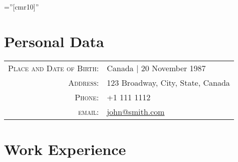 \documentclass[a4paper,10pt]{article} %
\begin{document}
\pagestyle{empty} %

\font\fb=''[cmr10]'' %


\par{\bigskip\par} %

\section{Personal Data}

\begin{tabular}{rl}
  \textsc{Place and Date of Birth:} & Canada  | 20 November 1987                   \\
  \textsc{Address:}                 & 123 Broadway, City, State, Canada            \\
  \textsc{Phone:}                   & +1 111 1112                                  \\
  \textsc{email:}                   & \href{mailto:john@smith.com}{john@smith.com} 
\end{tabular}


\section{Work Experience}
\end{document}
